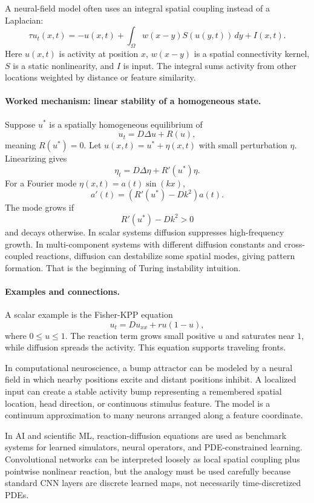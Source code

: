 A neural-field model often uses an integral spatial coupling instead of a Laplacian:
\[
\tau u_t(x,t)
=-u(x,t)+\int_\Omega w(x-y)S(u(y,t))\,dy+I(x,t).
\]
Here \(u(x,t)\) is activity at position \(x\), \(w(x-y)\) is a spatial connectivity kernel, \(S\) is a static nonlinearity, and \(I\) is input. The integral sums activity from other locations weighted by distance or feature similarity.

\paragraph{Worked mechanism: linear stability of a homogeneous state.}
Suppose \(u^*\) is a spatially homogeneous equilibrium of
\[
u_t=D\Delta u+R(u),
\]
meaning \(R(u^*)=0\). Let \(u(x,t)=u^*+\eta(x,t)\) with small perturbation \(\eta\). Linearizing gives
\[
\eta_t=D\Delta \eta+R'(u^*)\eta.
\]
For a Fourier mode \(\eta(x,t)=a(t)\sin(kx)\),
\[
a'(t)=\left(R'(u^*)-Dk^2\right)a(t).
\]
The mode grows if
\[
R'(u^*)-Dk^2>0
\]
and decays otherwise. In scalar systems diffusion suppresses high-frequency growth. In multi-component systems with different diffusion constants and cross-coupled reactions, diffusion can destabilize some spatial modes, giving pattern formation. That is the beginning of Turing instability intuition.

\paragraph{Examples and connections.}
A scalar example is the Fisher-KPP equation
\[
u_t=D u_{xx}+r u(1-u),
\]
where \(0\leq u\leq 1\). The reaction term grows small positive \(u\) and saturates near \(1\), while diffusion spreads the activity. This equation supports traveling fronts.

In computational neuroscience, a bump attractor can be modeled by a neural field in which nearby positions excite and distant positions inhibit. A localized input can create a stable activity bump representing a remembered spatial location, head direction, or continuous stimulus feature. The model is a continuum approximation to many neurons arranged along a feature coordinate.

In AI and scientific ML, reaction-diffusion equations are used as benchmark systems for learned simulators, neural operators, and PDE-constrained learning. Convolutional networks can be interpreted loosely as local spatial coupling plus pointwise nonlinear reaction, but the analogy must be used carefully because standard CNN layers are discrete learned maps, not necessarily time-discretized PDEs.

